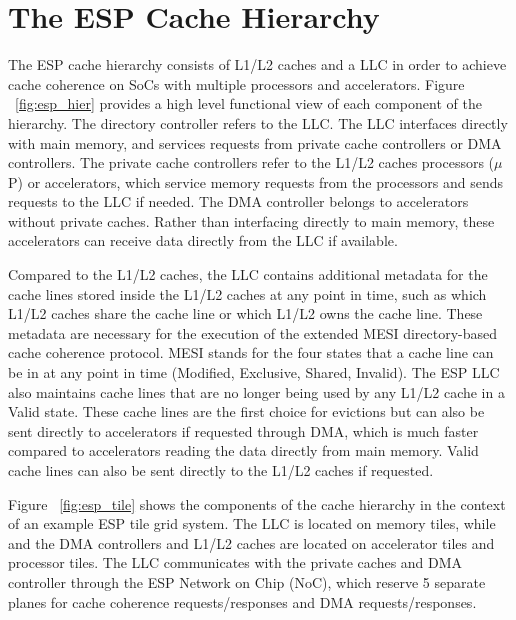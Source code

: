 \section{The ESP Cache Hierarchy}
\label{sec:cache}

The ESP cache hierarchy consists of L1/L2 caches and a LLC in order to achieve cache coherence on SoCs with multiple processors and accelerators. Figure ~\ref{fig:esp_hier} provides a high level functional view of each component of the hierarchy.
The directory controller refers to the LLC. The LLC interfaces directly with main memory, and services requests from private cache controllers or DMA controllers. 
The private cache controllers refer to the L1/L2 caches processors ($\mu$P) or accelerators, 
which service memory requests from the processors and sends requests to the LLC if needed. The DMA controller belongs to accelerators
without private caches. Rather than interfacing directly to main memory, these accelerators can receive data directly from the LLC if available.
\par Compared to the L1/L2 caches, the LLC contains additional metadata for the cache lines stored inside the L1/L2 caches at any point in time, such as which L1/L2 caches share the cache line or which L1/L2 owns the cache line. 
These metadata are necessary for the execution of the extended MESI directory-based cache coherence protocol. MESI stands for the four states that a cache line can be in at any point in time (Modified, Exclusive, Shared, Invalid).
The ESP LLC also maintains cache lines that are no longer being used by any L1/L2 cache in a Valid state. These cache lines are the first choice for evictions but can also be sent directly to accelerators if requested through DMA, which is 
much faster compared to accelerators reading the data directly from main memory. Valid cache lines can also be sent directly to the L1/L2 caches if requested.
\par Figure ~\ref{fig:esp_tile} shows the components of the cache hierarchy in the context of an example ESP tile grid system. The LLC is located on memory tiles, while and the DMA controllers and L1/L2 caches are located on 
accelerator tiles and processor tiles. The LLC communicates with the private caches and DMA controller through the ESP Network on Chip (NoC), which reserve 5 separate planes 
for cache coherence requests/responses and DMA requests/responses.



